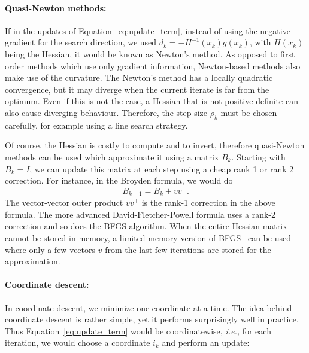 
\paragraph{Quasi-Newton methods:}
If in the updates of Equation~\ref{eq:update_term}, instead of using the negative gradient for the search direction, we used $d_k = -H^{-1}(x_k)g(x_k)$, with $H(x_k)$ being the Hessian, it would be known as Newton's method. As opposed to first order methods which use only gradient information, Newton-based methods also make use of the curvature. The Newton's method has a locally quadratic convergence, but it may diverge when the current iterate is far from the optimum. Even if this is not the case, a Hessian that is not positive definite can also cause diverging behaviour. Therefore, the step size $\rho_k$ must be chosen carefully, for example using a line search strategy.

Of course, the Hessian is costly to compute and to invert, therefore quasi-Newton methods can be used which approximate it using a matrix $B_k$. Starting with $B_k = I$, we can update this matrix at each step using a cheap rank 1 or rank 2 correction. For instance, in the Broyden formula, we would do
\begin{equation}
B_{k+1} = B_k + vv^\top.
\end{equation}
The vector-vector outer product $vv^\top$ is the rank-1 correction in the above formula. The more advanced David-Fletcher-Powell formula uses a rank-2 correction and so does the \ac{BFGS} algorithm. When the entire Hessian matrix cannot be stored in memory, a limited memory version of BFGS~\citep{wright1999numerical} can be used where only a few vectors $v$ from the last few iterations are stored for the approximation.

\paragraph{Coordinate descent:}
In coordinate descent, we minimize one coordinate at a time. The idea behind coordinate descent is rather simple, yet it performs surprisingly well in practice. Thus  Equation~\ref{eq:update_term} would be coordinatewise, \textit{i.e.,} for each iteration, we would choose a coordinate $i_k$ and perform an update:

